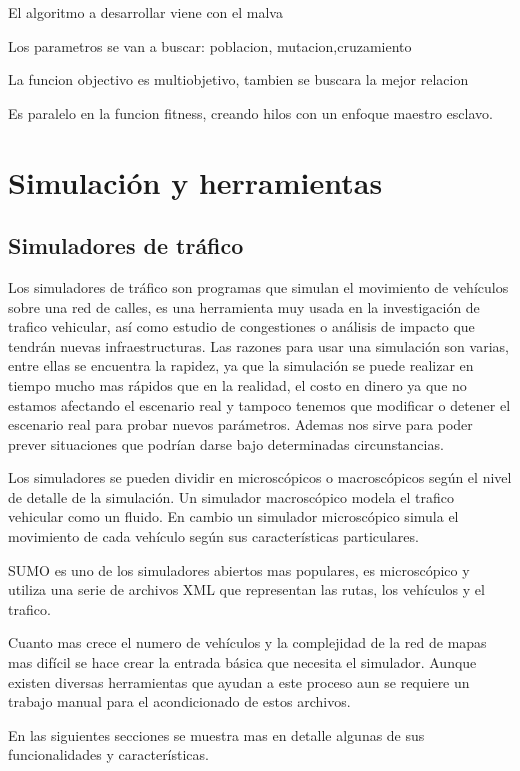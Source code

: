 El algoritmo a desarrollar viene con el malva

Los parametros se van a buscar: poblacion, mutacion,cruzamiento

La funcion objectivo es multiobjetivo, tambien se buscara la mejor relacion

Es paralelo en la funcion fitness, creando hilos
con un enfoque maestro esclavo.




\section{Simulación y herramientas}

\subsection{Simuladores de tráfico}
Los simuladores de tráfico son programas que simulan el movimiento de vehículos sobre una red de calles, es una herramienta muy usada en la investigación de trafico vehicular, así como estudio de congestiones o análisis de impacto que tendrán nuevas infraestructuras.  Las razones para usar una simulación son varias, entre ellas se encuentra  la rapidez, ya que la simulación se puede realizar en tiempo mucho mas rápidos que en la realidad, el costo en dinero ya que no estamos afectando el escenario real  y tampoco tenemos que modificar o detener el escenario real para probar nuevos parámetros. Ademas nos sirve para poder prever situaciones que podrían darse bajo determinadas circunstancias.

Los simuladores se pueden dividir en microscópicos o macroscópicos según el nivel de detalle de la simulación. Un simulador macroscópico modela  el trafico vehicular como un fluido. En cambio un simulador microscópico simula el movimiento de cada vehículo según sus características particulares.

SUMO\citep{SUMO} es uno de los simuladores abiertos mas populares, es microscópico y utiliza una serie de archivos  XML que representan las rutas, los vehículos y el trafico.  

Cuanto mas crece el numero de vehículos y la complejidad de la red de mapas mas difícil se hace crear la entrada básica que necesita el simulador. Aunque existen diversas herramientas que ayudan a este proceso aun se requiere un trabajo manual para el acondicionado de estos archivos.

En las siguientes secciones se muestra mas en detalle algunas de sus funcionalidades y características.


